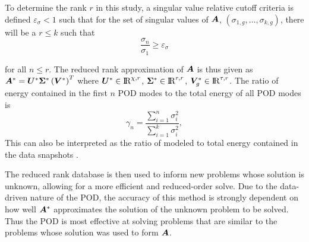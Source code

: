 	\ind To determine the rank $r$ in this study, a singular value relative cutoff criteria is defined $\varepsilon_\sigma < 1$ such that for the set of singular values of $\bm{A}$, $(\sigma_{1,g},\dots,\sigma_{k,g})$, there will be a $r \leq k$ such that
	\begin{equation}
		\frac{\sigma_{n}}{\sigma_{1}} \geq \varepsilon_\sigma \label{cutoff_eps}
	\end{equation}
	
	for all $n \leq r$. The reduced rank approximation of $\bm{A}$ is thus given as $\bm{A}^{*}  = \bm{U}^*\bm{\Sigma}^*\left(\bm{V}^{*}\right)^T $ where $\bm{U}^* \in {\rm I\!R}^{\chi,r}$, $\bm{\Sigma}^* \in {\rm I\!R}^{r,r}$, $\bm{V}_g^{*} \in {\rm I\!R}^{\tau,r}$. The ratio of energy contained in the first $n$ POD modes to the total energy of all POD modes \cite{Benner-siam-2015} is
	\begin{equation}
		\gamma_n = \frac{\sum_{i=1}^{n} \sigma_i^2}{\sum_{i=1}^{k} \sigma_i^2}, \label{worth_gam}
	\end{equation}
	This can also be interpreted as the ratio of modeled to total energy contained in the data snapshots \cite{gubisch-volkwein}.
	
	\ind The reduced rank database is then used to inform new problems whose solution is unknown, allowing for a more efficient and reduced-order solve. Due to the data-driven nature of the POD, the accuracy of this method is strongly dependent on how well $\bm{A}^*$ approximates the solution of the unknown problem to be solved. Thus the POD is most effective at solving problems that are similar to the problems whose solution was used to form $\bm{A}$.
	
